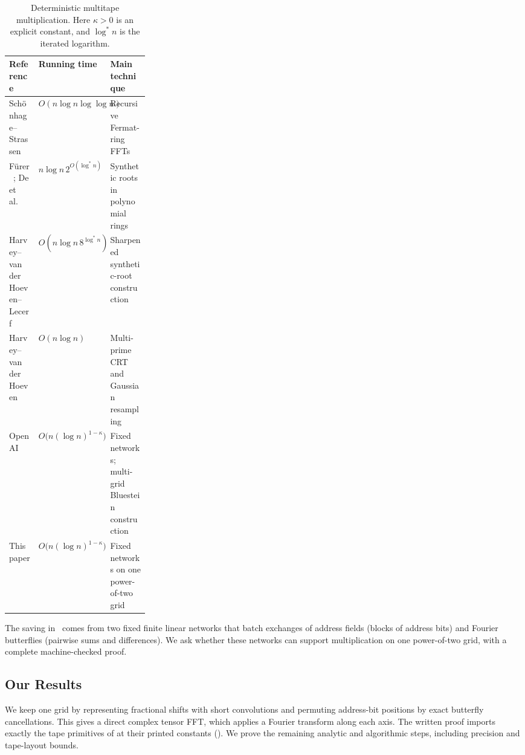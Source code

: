 \documentclass[11pt]{article}
\theoremstyle{definition}
\renewcommand{\label}[1]{}%
\begin{document}
\begin{table}[htbp]
\centering\footnotesize
\setlength{\tabcolsep}{4pt}
\renewcommand{\arraystretch}{1.05}
\begin{tabularx}{\linewidth}{@{}>{\raggedright\arraybackslash}X
>{\raggedright\arraybackslash}p{0.27\linewidth}
>{\raggedright\arraybackslash}X@{}}
\toprule
\textbf{Reference} & \textbf{Running time} & \textbf{Main technique}\\
\midrule
Sch\"onhage--Strassen~\cite{SS71}
& $O(n\log n\log\log n)$ & Recursive Fermat-ring FFTs\\
F\"urer~\cite{Fur07,Fur09}; De et al.~\cite{DKSS13}
& $n\log n\,2^{O(\log^* n)}$ & Synthetic roots in polynomial rings\\
Harvey--van der Hoeven--Lecerf~\cite{HvdHL16}
& $O(n\log n\,8^{\log^* n})$ & Sharpened synthetic-root construction\\
Harvey--van der Hoeven~\cite{HvdH21}
& $O(n\log n)$ & Multi-prime CRT and Gaussian resampling\\
OpenAI~\cite{OAI26}
& $O\bigl(n(\log n)^{1-\kappa}\bigr)$ & Fixed networks; multi-grid Bluestein construction\\
This paper
& $O\bigl(n(\log n)^{1-\kappa}\bigr)$ & Fixed networks on one power-of-two grid\\
\bottomrule
\end{tabularx}
\caption{Deterministic multitape multiplication. Here $\kappa>0$ is an explicit constant, and $\log^* n$ is the iterated logarithm.}
\label{tab:intmul-history}
\end{table}

The saving in~\cite{OAI26} comes from two fixed finite linear networks that batch exchanges of address fields (blocks of address bits) and Fourier butterflies (pairwise sums and differences).
We ask whether these networks can support multiplication on one power-of-two grid, with a complete machine-checked proof.

\subsection{Our Results}\label{sec:results}

We keep one grid by representing fractional shifts with short convolutions and permuting address-bit positions by exact butterfly cancellations.
This gives a direct complex tensor FFT, which applies a Fourier transform along each axis.
The written proof imports exactly the tape primitives of \cite[Lemmas~3--4, Lemma~12, and Proposition~14]{OAI26} at their printed constants ().
We prove the remaining analytic and algorithmic steps, including precision and tape-layout bounds.
\end{document}
